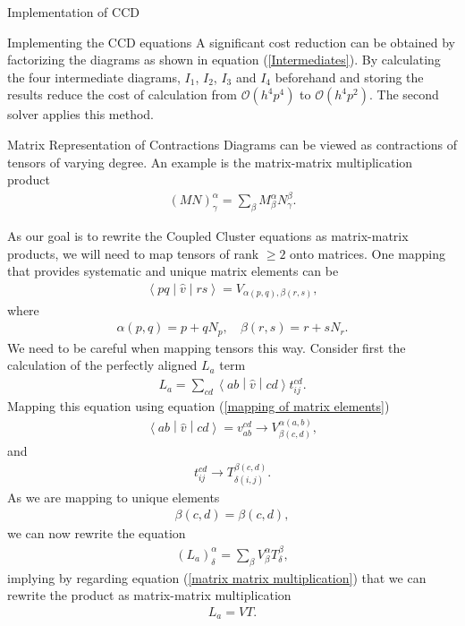 \documentclass[twoside,english]{uiofysmaster}
\begin{document}
\begin{chapter}{Implementation of CCD}
\begin{section}{Implementing the CCD equations}
		A significant cost reduction can be obtained by factorizing the diagrams as shown in equation (\ref{Intermediates}). By calculating the four intermediate diagrams, $I_1$, $I_2$, $I_3$ and $I_4$ beforehand and storing the results reduce the cost of calculation from $\mathcal{O}(h^4 p^4)$ to $\mathcal{O}(h^4 p^2)$. The second solver applies this method. 

	\end{section}

	\begin{section}{Matrix Representation of Contractions}
		Diagrams can be viewed as contractions of tensors of varying degree. An example is the matrix-matrix multiplication product
		\begin{align}
		 	\left( M N \right)_{\gamma}^{\alpha} = \sum_{\beta} M_{\beta}^\alpha N_\gamma^\beta .
		 	\label{matrix matrix multiplication}
		\end{align} 

		As our goal is to rewrite the Coupled Cluster equations as matrix-matrix products, we will need to map tensors of rank $\geq 2$ onto matrices. One mapping that provides systematic and unique matrix elements can be 
		\begin{align}
			\left<pq\middle| \hat v\middle|rs\right> = V_{\alpha(p,q),\beta(r,s)},
		\end{align}
		where 
		\begin{align}
			\alpha(p,q) = p + q N_p, \;\,\:\; \beta(r,s) = r + s N_r.
			\label{mapping of matrix elements}
		\end{align}
		We need to be careful when mapping tensors this way. Consider first the calculation of the perfectly aligned $L_a$ term
		\begin{align}
			L_a = \sum_{cd} \left< ab \middle| \hat v\middle|cd\right> t_{ij}^{cd}.
		\end{align}
		Mapping this equation using equation (\ref{mapping of matrix elements})
		\begin{align}
			\left< ab \middle| \hat v\middle|cd\right> = v_{ab}^{cd} \rightarrow V_{\beta(c,d)}^{\alpha(a,b)},
		\end{align}
		and
		\begin{align}
			t_{ij}^{cd} \rightarrow T_{\delta(i,j)}^{\beta(c,d)}.
		\end{align}
		As we are mapping to unique elements 
		\begin{align}
			\beta(c,d) = \beta(c,d),
		\end{align}
		we can now rewrite the equation 
		\begin{align}
			(L_a)_ \delta^\alpha = \sum_ \beta V_ \beta^\alpha T_ \delta^\beta,
		\end{align}
		implying by regarding equation (\ref{matrix matrix multiplication}) that we can rewrite the product as matrix-matrix multiplication 
		\begin{align}
			L_a = VT.
		\end{align}


\end{section}
\end{chapter}
\end{document}
